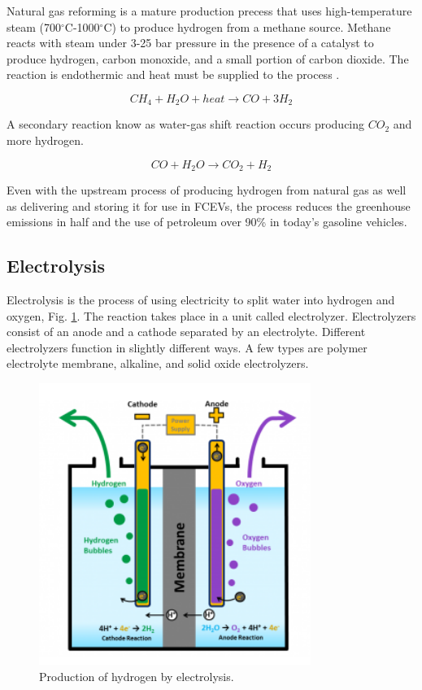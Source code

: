 \documentclass[11pt,letterpaper]{article}
\begin{document}
Natural gas reforming is a mature production precess that uses high-temperature steam (700$^{\circ}$C-1000$^{\circ}$C) to produce hydrogen from a methane source. Methane reacts with steam under 3-25 bar pressure in the presence of a catalyst to produce hydrogen, carbon monoxide, and a small portion of carbon dioxide. The reaction is endothermic and heat must be supplied to the process \cite{noauthor_hydrogen_nodate}.

\begin{equation}
CH_4 + H_2O + heat \rightarrow CO + 3H_2
\end{equation}

A secondary reaction know as water-gas shift reaction occurs producing $CO_2$ and more hydrogen.

\begin{equation}
CO + H_2O \rightarrow CO_2 + H_2
\end{equation}

Even with the upstream process of producing hydrogen from natural gas as well as delivering and storing it for use in FCEVs, the process reduces the greenhouse emissions in half and the use of petroleum over 90\% in today's gasoline vehicles.

\subsection{Electrolysis}

Electrolysis is the process of using electricity to split water into hydrogen and oxygen, Fig. \ref{fig:electro}. The reaction takes place in a unit called electrolyzer. Electrolyzers consist of an anode and a cathode separated by an electrolyte. Different electrolyzers function in slightly different ways. A few types are polymer electrolyte membrane, alkaline, and solid oxide electrolyzers.

\begin{figure}[H]
	\centering
	\includegraphics[width=0.4\linewidth]{figures/electrolysis.png}
	\hfill
	\caption{Production of hydrogen by electrolysis.}
	\label{fig:electro}
\end{figure}
\end{document}
